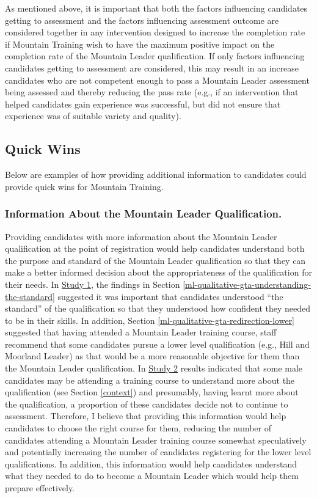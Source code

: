 \documentclass[
  12pt,
  a4paper,
]{book}
\begin{document}
As mentioned above, it is important that both the factors influencing candidates getting to assessment and the factors influencing assessment outcome are considered together in any intervention designed to increase the completion rate if Mountain Training wish to have the maximum positive impact on the completion rate of the Mountain Leader qualification. If only factors influencing candidates getting to assessment are considered, this may result in an increase candidates who are not competent enough to pass a Mountain Leader assessment being assessed and thereby reducing the pass rate (e.g., if an intervention that helped candidates gain experience was successful, but did not ensure that experience was of suitable variety and quality).

\hypertarget{quick-wins}{%
\subsection{Quick Wins}\label{quick-wins}}

Below are examples of how providing additional information to candidates could provide quick wins for Mountain Training.

\hypertarget{information-about-the-mountain-leader-qualification.}{%
\subsubsection{Information About the Mountain Leader Qualification.}\label{information-about-the-mountain-leader-qualification.}}

Providing candidates with more information about the Mountain Leader qualification at the point of registration would help candidates understand both the purpose and standard of the Mountain Leader qualification so that they can make a better informed decision about the appropriateness of the qualification for their needs. In \protect\hyperlink{ml-qualitative}{Study 1}, the findings in Section \ref{ml-qualitative-gta-understanding-the-standard} suggested it was important that candidates understood ``the standard'' of the qualification so that they understood how confident they needed to be in their skills. In addition, Section \ref{ml-qualitative-gta-redirection-lower} suggested that having attended a Mountain Leader training course, staff recommend that some candidates pursue a lower level qualification (e.g., Hill and Moorland Leader) as that would be a more reasonable objective for them than the Mountain Leader qualification. In \protect\hyperlink{male-gta}{Study 2} results indicated that some male candidates may be attending a training course to understand more about the qualification (see Section \ref{context}) and presumably, having learnt more about the qualification, a proportion of these candidates decide not to continue to assessment. Therefore, I believe that providing this information would help candidates to choose the right course for them, reducing the number of candidates attending a Mountain Leader training course somewhat speculatively and potentially increasing the number of candidates registering for the lower level qualifications. In addition, this information would help candidates understand what they needed to do to become a Mountain Leader which would help them prepare effectively.
\end{document}
